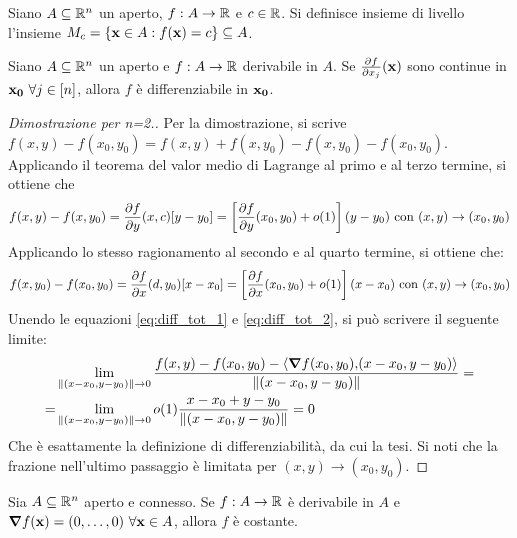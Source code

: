 \begin{definition}
    Siano $A \subseteq \mathbb{R}^n$ un aperto, $f:A \to \mathbb{R}$ e $c \in \mathbb{R}$. Si definisce insieme di livello l'insieme $M_c = \{ \vb{x} \in A : f(\vb{x})=c\}\subseteq A$.
\end{definition}

\begin{theorem}
    \label{thm:diff_tot}
    Siano $A \subseteq \mathbb{R}^n$ un aperto e $f: A \to \mathbb{R}$ derivabile in $A$. Se $\frac{\partial f}{\partial x_j} (\vb{x})$ sono continue in $\vb{x_0} \ \forall j \in [n]$, allora $f$ è differenziabile in $\vb{x_0}$.
\end{theorem}

\begin{proof}[Dimostrazione per n=2.]
    Per la dimostrazione, si scrive $f(x,y)-f(x_0,y_0)=f(x,y)+f(x,y_0)-f(x,y_0)-f(x_0,y_0)$. Applicando il teorema del valor medio di Lagrange al primo e al terzo termine, si ottiene che
    \begin{equation}\label{eq:diff_tot_1}
        f(x,y)-f(x,y_0)=\frac{\partial f}{\partial y}(x,c)[y-y_0]=\left[\frac{\partial f}{\partial y}(x_0,y_0)+o(1)\right](y-y_0) \text{ con } (x,y)\to (x_0,y_0)
    \end{equation}
    Applicando lo stesso ragionamento al secondo e al quarto termine, si ottiene che:
    \begin{equation}\label{eq:diff_tot_2}
        f(x,y_0)-f(x_0,y_0)=\frac{\partial f}{\partial x}(d,y_0)[x-x_0]=\left[\frac{\partial f}{\partial x}(x_0,y_0)+o(1)\right](x-x_0) \text{ con } (x,y)\to(x_0,y_0)
    \end{equation}
    Unendo le equazioni \eqref{eq:diff_tot_1} e \eqref{eq:diff_tot_2}, si può scrivere il seguente limite:
    \begin{align*}
        &\lim_{\norm{(x-x_0,y-y_0)}\to 0}\frac{f(x,y)-f(x_0,y_0)-\left\langle\grad f(x_0,y_0){,}(x-x_0,y-y_0)\right\rangle}{\norm{(x-x_0,y-y_0)}}=\\
        =&\lim_{\norm{(x-x_0,y-y_0)}\to 0}o(1)\frac{x-x_0+y-y_0}{\norm{(x-x_0,y-y_0)}}=0
    \end{align*}
    Che è esattamente la definizione di differenziabilità, da cui la tesi. Si noti che la frazione nell'ultimo passaggio è limitata per $(x,y)\to(x_0,y_0)$.
\end{proof}

\begin{theorem}
    Sia $A \subseteq \mathbb{R}^n$ aperto e connesso. Se $f: A \to \mathbb{R}$ è derivabile in $A$ e $\grad f (\vb{x})=(0,\dots,0) \ \forall \vb{x} \in A$, allora $f$ è costante.
\end{theorem}

